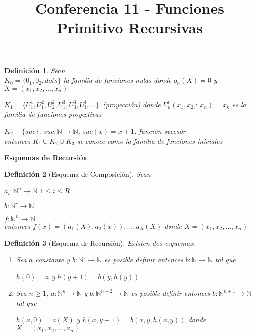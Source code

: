 \documentclass[a4paper,1pt]{report}
\title{Conferencia 11 - Funciones Primitivo Recursivas}
\author{}
\newtheorem*{dfn}{Definición}
\begin{document}
\maketitle

\begin{dfn}
 Sean \\
 
 $K_0=\{0_1,0_2,dots\}$ la familia de funciones nulas donde $o_n(X)=0$ y $X=(x_1,x_2,\dots,x_n)$
 
 $K_1=\{U^1_1, U^2_1,U^2_2,U^3_1,U^3_3,U^3_3,\dots\}$~(proyección) donde $U^n_k(x_1,x_2,\dot,x_n)=x_k$ es la familia de funciones proyectivas
 
 $K_2-\{suc\}$, $suc:\mathbb{N}\rightarrow\mathbb{N}$, $suc(x)=x+1$, función sucesor\\
 
 entonces $K_1\cup K_2\cup K_3$ se conoce como la familia de funciones iniciales
\end{dfn}


\textbf{Esquemas de Recursión}

\begin{dfn}[Esquema de Composición]
Sean

$a_i:\mathbb{N}^n\rightarrow\mathbb{N}$  $1\leq i \leq R$

$b:\mathbb{N}^r\rightarrow\mathbb{N}$

$f:\mathbb{N}^n\rightarrow\mathbb{N}$\\

entonces $f(x)=(a_1(X),a_2(x)),\dots,a_R(X)$ donde $X=(x_1,x_2,\dots,x_n)$
 
\end{dfn}



\begin{dfn}[Esquema de Recursión]
Existen dos esquemas:

 \begin{enumerate}
  \item Sea $a$ constante y $b:\mathbb{N}^2\rightarrow\mathbb{N}$
  es posible definir entonces $b:\mathbb{N}\rightarrow\mathbb{N}$ tal que
  
  $h(0)=a$ y $h(y+1)=b(y,h(y))$
  \item Sea $n\geq 1$, $a:\mathbb{N}^n\rightarrow\mathbb{N}$ y $b:\mathbb{N}^{n+2}\rightarrow\mathbb{N}$
  es posible definir entonces $b:\mathbb{N}^{n+1}\rightarrow\mathbb{N}$ tal que
  
  $h(x,0)=a(X)$ y $h(x,y+1)=b(x,y,h(x,y))$ donde $X=(x_1,x_2,\dots,x_n)$
 \end{enumerate}

\end{dfn}
\end{document}
